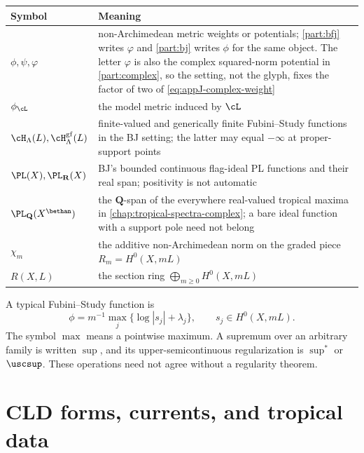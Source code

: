 \begin{center}
\begin{tabular}{@{}p{}p{}@{}}
\toprule
Symbol & Meaning \\
\midrule
\(\phi,\psi,\varphi\)
  & non-Archimedean metric weights or potentials; \cref{part:bfj} writes
    \(\varphi\) and \cref{part:bj} writes \(\phi\) for the same object.  The
    letter \(\varphi\) is also the complex squared-norm potential in
    \cref{part:complex}, so the setting, not the glyph, fixes the factor of
    two of \eqref{eq:appJ-complex-weight} \\
\(\phi_\cL\)
  & the model metric induced by \(\cL\) \\
\(\cH_\Lambda(L),\cH^{\mathrm{gf}}_\Lambda(L)\)
  & finite-valued and generically finite Fubini--Study functions in the BJ
    setting; the latter may equal \(-\infty\) at proper-support points \\
\(\PL(X),\PL_{\mathbf R}(X)\)
  & BJ's bounded continuous flag-ideal PL functions and their real span;
    positivity is not automatic \\
\(\PL_{\mathbf Q}(X^{\bethan})\)
  & the \(\mathbf Q\)-span of the everywhere real-valued tropical maxima
    in \cref{chap:tropical-spectra-complex}; a bare ideal function with a
    support pole need not belong \\
\(\chi_m\)
  & the additive non-Archimedean norm on the graded piece
    \(R_m=H^0(X,mL)\) \\
\(R(X,L)\)
  & the section ring \(\bigoplus_{m\geq0}H^0(X,mL)\) \\
\bottomrule
\end{tabular}
\end{center}

A typical Fubini--Study function is
\[
 \phi=m^{-1}\max_j\{\log|s_j|+\lambda_j\},
 \qquad s_j\in H^0(X,mL).
\]
The symbol \(\max\) means a pointwise maximum.  A supremum over an arbitrary
family is written \(\sup\), and its upper-semicontinuous regularization is
\(\sup^*\) or \(\uscsup\).  These operations need not agree without a
regularity theorem.

\section{CLD forms, currents, and tropical data}
\label{sec:appK-cld}


